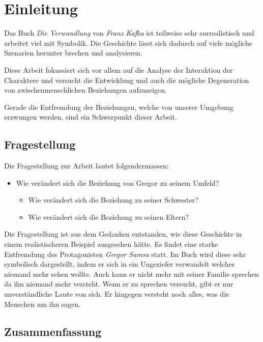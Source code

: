 \documentclass[12pt,a4paper,twoside,titlepage]{article}
\title{\titleText}
\author{\authorText}
\date{\dateText}
\begin{document}
	\maketitle
	
	\tableofcontents
	
	\section{Einleitung}
	
	
	Das Buch \textit{Die Verwandlung} von \textit{Franz Kafka} ist teilweise sehr surrealistisch und arbeitet viel mit Symbolik. Die Geschichte lässt sich dadurch auf viele mögliche Szenarien herunter brechen und analysieren.
	
	Diese Arbeit fokussiert sich vor allem auf die Analyse der Interaktion der Charaktere und versucht die Entwicklung und auch die mögliche Degeneration von zwischenmenschlichen Beziehungen aufzuzeigen.
	
	Gerade die Entfremdung der Beziehungen, welche von unserer Umgebung erzwungen werden, sind ein Schwerpunkt dieser Arbeit.
	
	
	\subsection{Fragestellung}
	Die Fragestellung zur Arbeit lautet folgendermassen:
	\begin{itemize}
		\item Wie verändert sich die Beziehung von Gregor zu seinem Umfeld?
		\begin{itemize}
			\item Wie verändert sich die Beziehung zu seiner Schwester?
			\item Wie verändert sich die Beziehung zu seinen Eltern?
		\end{itemize}
	\end{itemize}
	
	Die Fragestellung ist aus dem Gedanken entstanden, wie diese Geschichte in einem realistischeren Beispiel ausgesehen hätte. Es findet eine starke Entfremdung des Protagonisten \textit{Gregor Samsa} statt. Im Buch wird diese sehr symbolisch dargestellt, indem er sich in ein Ungeziefer verwandelt welches niemand mehr sehen wollte. Auch kann er nicht mehr mit seiner Familie sprechen da ihn niemand mehr versteht. Wenn er zu sprechen versucht, gibt er nur unverständliche Laute von sich. Er hingegen versteht noch alles, was die Menschen um ihn sagen.
	
	\subsection{Zusammenfassung}
	
\end{document}
